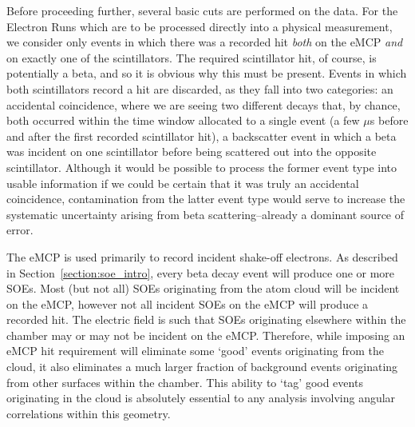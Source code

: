 
Before proceeding further, several basic cuts are performed on the data.  For the Electron Runs which are to be processed directly into a physical measurement, we consider only events in which there was a recorded hit \emph{both} on the eMCP \emph{and} on exactly one of the scintillators.  The required scintillator hit, of course, is potentially a beta, and so it is obvious why this must be present.  Events in which both scintillators record a hit are discarded, as they fall into two categories:  an accidental coincidence, where we are seeing two different decays that, by chance, both occurred within the time window allocated to a single event (a few $\mu$s before and after the first recorded scintillator hit), a backscatter event in which a beta was incident on one scintillator before being scattered out into the opposite scintillator.  Although it would be possible to process the former event type into usable information if we could be certain that it was truly an accidental coincidence, contamination from the latter event type would serve to increase the systematic uncertainty arising from beta scattering--already a dominant source of error.


The eMCP is used primarily to record incident shake-off electrons.  As described in Section~\ref{section:soe_intro}, every beta decay event will produce one or more SOEs.  Most (but not all) SOEs originating from the atom cloud will be incident on the eMCP, 
however not all incident SOEs on the eMCP will produce a recorded hit.  The electric field is such that SOEs originating elsewhere within the chamber may or may not be incident on the eMCP.  Therefore, while imposing an eMCP hit requirement will eliminate some `good' events originating from the cloud, it also eliminates a much larger fraction of background events originating from other surfaces within the chamber.  This ability to `tag' good events originating in the cloud is absolutely essential to any analysis involving angular correlations within this geometry.



